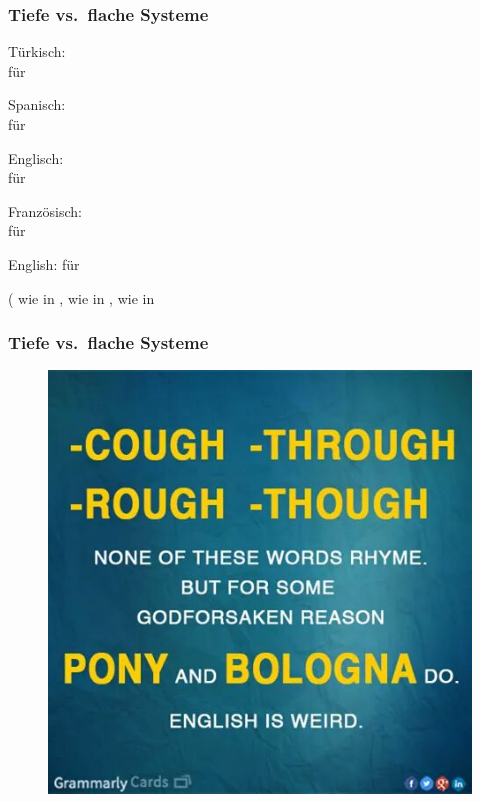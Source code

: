 \begin{frame}
\frametitle{Tiefe vs.\ flache Systeme}


	\ea Türkisch: \\
	 für \textipa{[dYkkan]}
	
	\ex Spanisch: \\
	 für \textipa{[negoTio]}
	
	\ex Englisch: \\
	 für \textipa{[bIzn@z]}
	
	\ex Französisch: \\
	 für \textipa{[butik]}
	\z 
	
\pause	
	
	\ea English:  für  

\pause  
	
	( wie in ,  wie in ,  wie in 
	\z 

\end{frame}


\begin{frame}
\frametitle{Tiefe vs.\ flache Systeme}


\begin{figure}
\centering
	\includegraphics[scale=.3]{material/04GraphEnglischPGK}
\end{figure}

\end{frame}


